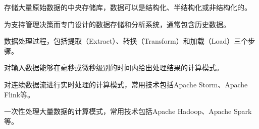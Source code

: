 \begin{description}[leftmargin=4cm, style=nextline]
\item[\highlight{数据湖}] 存储大量原始数据的中央存储库，数据可以是结构化、半结构化或非结构化的。

\item[\highlight{数据仓库}] 为支持管理决策而专门设计的数据存储和分析系统，通常包含历史数据。

\item[\highlight{ETL}] 数据处理过程，包括提取（Extract）、转换（Transform）和加载（Load）三个步骤。

\item[\highlight{实时计算}] 对输入数据能够在毫秒或微秒级别的时间内给出处理结果的计算模式。

\item[\highlight{流式处理}] 对连续数据流进行实时处理的计算模式，常用技术包括Apache Storm、Apache Flink等。

\item[\highlight{批处理}] 一次性处理大量数据的计算模式，常用技术包括Apache Hadoop、Apache Spark等。

\end{description}

